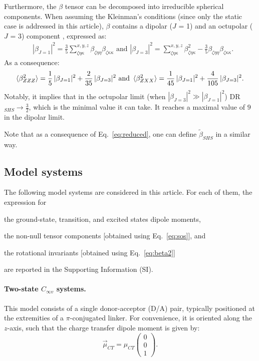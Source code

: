 \documentclass[journal=jpcafh]{achemso}
\begin{document}
Furthermore, the $\beta$ tensor can be decomposed into irreducible spherical components\cite{Jerphagnon1978}. When assuming the Kleinman's conditions (since only the static case is addressed in this article), $\beta$ contains a dipolar ($J$ = 1) and an octupolar ($J$ = 3) component \cite{Brasselet1998}, expressed as:\begin{align}
	&|\beta_{J=1}|^2 = \frac{3}{5}\sum_{\zeta\eta\kappa}^{x,y,z} \beta_{\zeta\eta\eta}\beta_{\zeta\kappa\kappa} \text{ and }|\beta_{J=3}|^2 =\sum_{\zeta\eta\kappa}^{x,y,z} \beta_{\zeta\eta\kappa}^2 - \frac{3}{5} \beta_{\zeta\eta\eta}\beta_{\zeta\kappa\kappa}. \label{eq:bj}
\end{align}
As a consequence:\begin{align}
		\braket{\beta^2_{ZZZ}} =  \frac{1}{5}\,|\beta_{J=1}|^2+\frac{2}{35}\,|\beta_{J=3}|^2 \text{ and } \braket{\beta^2_{ZXX}} = \frac{1}{45}\,|\beta_{J=1}|^2+\frac{4}{105}\,|\beta_{J=3}|^2.\label{eq:beta2}
\end{align}
Notably, it implies that in the octupolar limit (when $|\beta_{J=3}|^2 \gg |\beta_{J=1}|^2$) DR$_{SHS}\to\frac{3}{2}$, which is the minimal value it can take. It reaches a maximal value of $9$ in the dipolar limit.\cite{verbiest_second-order_2009}

Note that as a consequence of Eq.~\eqref{eq:reduced}, one can define $\tilde\beta_{SHS}$ in a similar way.

\subsection{Model systems}

The following model systems are considered in this article. For each of them, the expression for \begin{inparaenum}[i)]
	\item the ground-state, transition, and excited states dipole moments,
	\item the non-null tensor components [obtained using Eq.~\ref{eq:sos}], and
	\item the rotational invariants [obtained using Eq.~\eqref{eq:beta2}]
\end{inparaenum} are reported in the Supporting Information (SI).

\paragraph{Two-state $C_{\infty v}$ systems.}  
This model consists of a single donor-acceptor (D/A) pair, typically positioned at the extremities of a $\pi$-conjugated linker. For convenience, it is oriented along the $z$-axis, such that the charge transfer dipole moment is given by:  
\begin{equation*}
	\vec{\mu}_{CT} = \mu_{CT} \begin{pmatrix} 0 \\ 0 \\ 1 \end{pmatrix}.
\end{equation*}
\end{document}
